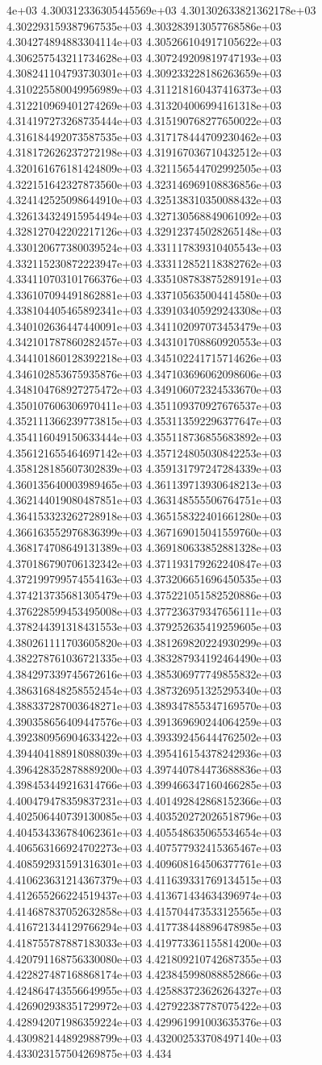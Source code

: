 4e+03	4.300312336305445569e+03	4.301302633821362178e+03	4.302293159387967535e+03	4.303283913057768586e+03	4.304274894883304114e+03	4.305266104917105622e+03	4.306257543211734628e+03	4.307249209819747193e+03	4.308241104793730301e+03	4.309233228186263659e+03	4.310225580049956989e+03	4.311218160437416373e+03	4.312210969401274269e+03	4.313204006994161318e+03	4.314197273268735444e+03	4.315190768277650022e+03	4.316184492073587535e+03	4.317178444709230462e+03	4.318172626237272198e+03	4.319167036710432512e+03	4.320161676181424809e+03	4.321156544702992505e+03	4.322151642327873560e+03	4.323146969108836856e+03	4.324142525098644910e+03	4.325138310350088432e+03	4.326134324915954494e+03	4.327130568849061092e+03	4.328127042202217126e+03	4.329123745028265148e+03	4.330120677380039524e+03	4.331117839310405543e+03	4.332115230872223947e+03	4.333112852118382762e+03	4.334110703101766376e+03	4.335108783875289191e+03	4.336107094491862881e+03	4.337105635004414580e+03	4.338104405465892341e+03	4.339103405929243308e+03	4.340102636447440091e+03	4.341102097073453479e+03	4.342101787860282457e+03	4.343101708860920553e+03	4.344101860128392218e+03	4.345102241715714626e+03	4.346102853675935876e+03	4.347103696062098606e+03	4.348104768927275472e+03	4.349106072324533670e+03	4.350107606306970411e+03	4.351109370927676537e+03	4.352111366239773815e+03	4.353113592296377647e+03	4.354116049150633444e+03	4.355118736855683892e+03	4.356121655464697142e+03	4.357124805030842253e+03	4.358128185607302839e+03	4.359131797247284339e+03	4.360135640003989465e+03	4.361139713930648213e+03	4.362144019080487851e+03	4.363148555506764751e+03	4.364153323262728918e+03	4.365158322401661280e+03	4.366163552976836399e+03	4.367169015041559760e+03	4.368174708649131389e+03	4.369180633852881328e+03	4.370186790706132342e+03	4.371193179262240847e+03	4.372199799574554163e+03	4.373206651696450535e+03	4.374213735681305479e+03	4.375221051582520886e+03	4.376228599453495008e+03	4.377236379347656111e+03	4.378244391318431553e+03	4.379252635419259605e+03	4.380261111703605820e+03	4.381269820224930299e+03	4.382278761036721335e+03	4.383287934192464490e+03	4.384297339745672616e+03	4.385306977749855832e+03	4.386316848258552454e+03	4.387326951325295340e+03	4.388337287003648271e+03	4.389347855347169570e+03	4.390358656409447576e+03	4.391369690244064259e+03	4.392380956904633422e+03	4.393392456444762502e+03	4.394404188918088039e+03	4.395416154378242936e+03	4.396428352878889200e+03	4.397440784473688836e+03	4.398453449216314766e+03	4.399466347160466285e+03	4.400479478359837231e+03	4.401492842868152366e+03	4.402506440739130085e+03	4.403520272026518796e+03	4.404534336784062361e+03	4.405548635065534654e+03	4.406563166924702273e+03	4.407577932415365467e+03	4.408592931591316301e+03	4.409608164506377761e+03	4.410623631214367379e+03	4.411639331769134515e+03	4.412655266224519437e+03	4.413671434634396974e+03	4.414687837052632858e+03	4.415704473533125565e+03	4.416721344129766294e+03	4.417738448896478985e+03	4.418755787887183033e+03	4.419773361155814200e+03	4.420791168756330080e+03	4.421809210742687355e+03	4.422827487168868174e+03	4.423845998088852866e+03	4.424864743556649955e+03	4.425883723626264327e+03	4.426902938351729972e+03	4.427922387787075422e+03	4.428942071986359224e+03	4.429961991003635376e+03	4.430982144892988799e+03	4.432002533708497140e+03	4.433023157504269875e+03	4.434